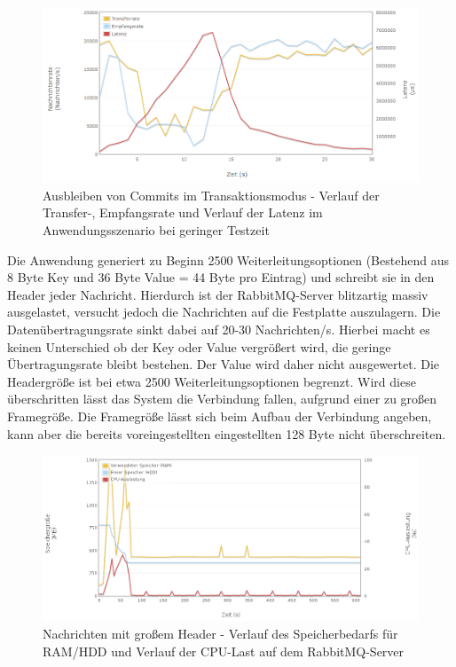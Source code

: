 \documentclass[	a4paper,
			11pt,
			oneside,
			parskip]{scrartcl}
\begin{document}
		\begin{figure}[!htb]
			\centering
			\includegraphics[width=\textwidth]{img/tx/trx.png}
			\caption{Ausbleiben von Commits im Transaktionsmodus - Verlauf der Transfer-, Empfangsrate und Verlauf der Latenz im Anwendungsszenario bei geringer Testzeit}
			\label{fig:tx-scenario}
		\end{figure}
	
	
	\clearpage
		{%
		  \newline
		  \newline
		  \newline
		}{%
		 Die Anwendung generiert zu Beginn 2500 Weiterleitungsoptionen (Bestehend aus 8 Byte Key und 36 Byte Value = 44 Byte pro Eintrag) und schreibt sie in den Header jeder Nachricht. Hierdurch ist der
		 RabbitMQ-Server blitzartig massiv ausgelastet, versucht jedoch die Nachrichten auf die Festplatte auszulagern. Die Datenübertragungsrate sinkt dabei auf 20-30 Nachrichten/s. Hierbei macht es
		 keinen Unterschied ob der Key oder Value vergrößert wird, die geringe Übertragungsrate bleibt bestehen. Der Value wird daher nicht ausgewertet. Die Headergröße ist bei etwa 2500
		 Weiterleitungsoptionen begrenzt. Wird diese überschritten lässt das System die Verbindung fallen, aufgrund einer zu großen Framegröße.
		}{%
		 Die Framegröße lässt sich beim Aufbau der
		 Verbindung angeben, kann aber die bereits voreingestellten eingestellten 128 Byte nicht überschreiten.
		}

		\begin{figure}[!htb]
			\centering
			\includegraphics[width=\textwidth]{img/header/header_server1.png}
			\caption{Nachrichten mit großem Header - Verlauf des Speicherbedarfs für RAM/HDD und Verlauf der CPU-Last auf dem RabbitMQ-Server}
			\label{fig:header-server1}
		\end{figure}
		
\end{document}
